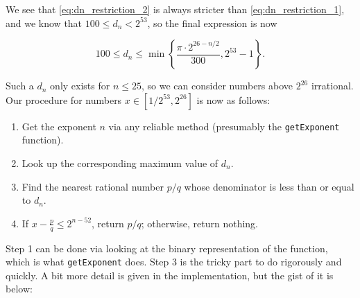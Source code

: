 \documentclass{article}
\begin{document}
We see that \eqref{eq:dn_restriction_2} is always stricter than \eqref{eq:dn_restriction_1}, and we know that $100 \leq d_n < 2^{53}$, so the final expression is now

$$\boxed{100 \leq d_n \leq \min \left\{ \frac{\pi\cdot 2^{26 - n/2}}{300}, 2^{53} - 1\right\}}.$$

Such a $d_n$ only exists for $n \leq 25$, so we can consider numbers above $2^{26}$ irrational. Our procedure for numbers $x\in [1/2^{53}, 2^{26}]$ is now as follows:

\begin{enumerate}
\item Get the exponent $n$ via any reliable method (presumably the \texttt{getExponent} function).
\item Look up the corresponding maximum value of $d_n$.
\item Find the nearest rational number $p/q$ whose denominator is less than or equal to $d_n$.
\item If $x-\frac{p}{q}\leq 2^{n-52}$, return $p/q$; otherwise, return nothing.
\end{enumerate}

Step 1 can be done via looking at the binary representation of the function, which is what \texttt{getExponent} does. Step 3 is the tricky part to do rigorously and quickly. A bit more detail is given in the implementation, but the gist of it is below:
\end{document}

